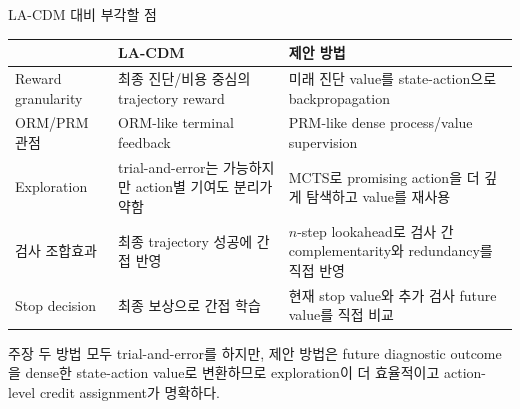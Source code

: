 \documentclass[
11pt,notheorems,hyperref={pdfauthor=whatever}
]{beamer}
\begin{document}
\begin{frame}{LA-CDM 대비 부각할 점}
\vspace{0.1em}
\begin{center}
\scriptsize
\begin{tabularx}{\textwidth}{p{}XX}
\toprule
 & \textbf{LA-CDM} & \textbf{제안 방법} \\
\midrule
Reward granularity &
최종 진단/비용 중심의 trajectory reward &
미래 진단 value를 state-action으로 backpropagation \\
\addlinespace
ORM/PRM 관점 &
ORM-like terminal feedback &
PRM-like dense process/value supervision \\
\addlinespace
Exploration &
trial-and-error는 가능하지만 action별 기여도 분리가 약함 &
MCTS로 promising action을 더 깊게 탐색하고 value를 재사용 \\
\addlinespace
검사 조합효과 &
최종 trajectory 성공에 간접 반영 &
\(n\)-step lookahead로 검사 간 complementarity와 redundancy를 직접 반영 \\
\addlinespace
Stop decision &
최종 보상으로 간접 학습 &
현재 stop value와 추가 검사 future value를 직접 비교 \\
\bottomrule
\end{tabularx}
\end{center}

\vspace{0.25em}
\begin{block}{주장}
\small
두 방법 모두 trial-and-error를 하지만, 제안 방법은 future diagnostic outcome을 dense한 state-action value로 변환하므로 exploration이 더 효율적이고 action-level credit assignment가 명확하다.
\end{block}
\end{frame}
\end{document}
